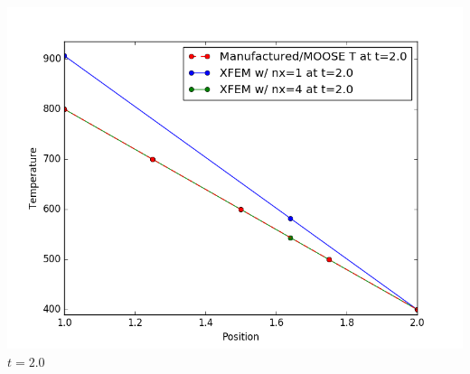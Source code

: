 \documentclass[]{beamer}
\begin{document}
\begin{frame}[t]
\begin{columns}
\begin{center}
			\includegraphics[scale=0.17]{figures/1D_rz_ls1m/1D_rz_ls1mat_u_vs_x_20}\\
			$t=2.0$
			\end{center}
	\end{columns}
\end{frame}
\end{document}
